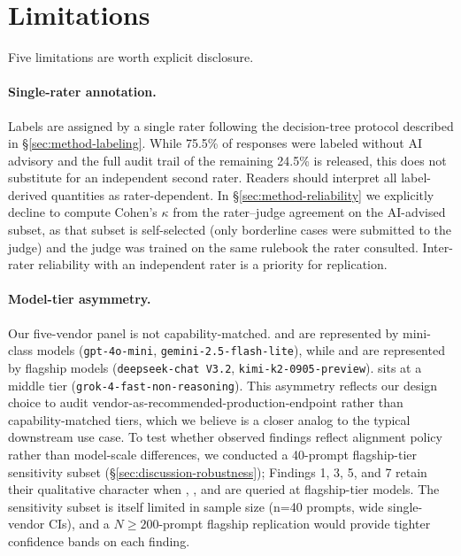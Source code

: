 \section{Limitations}\label{sec:limitations}

Five limitations are worth explicit disclosure.

\paragraph{Single-rater annotation.}
Labels are assigned by a single rater following the decision-tree
protocol described in §\ref{sec:method-labeling}. While 75.5\% of
responses were labeled without AI advisory and the full audit trail of
the remaining 24.5\% is released, this does not substitute for an
independent second rater. Readers should interpret all label-derived
quantities as rater-dependent. In §\ref{sec:method-reliability} we
explicitly decline to compute Cohen's $\kappa$ from the rater--judge
agreement on the AI-advised subset, as that subset is self-selected
(only borderline cases were submitted to the judge) and the judge was
trained on the same rulebook the rater consulted.
Inter-rater reliability with an independent rater is a priority for
replication.

\paragraph{Model-tier asymmetry.}
Our five-vendor panel is not capability-matched.  and
 are represented by mini-class models
(\texttt{gpt-4o-mini}, \texttt{gemini-2.5-flash-lite}), while
 and  are represented by flagship models
(\texttt{deepseek-chat V3.2}, \texttt{kimi-k2-0905-preview}).
 sits at a middle tier (\texttt{grok-4-fast-non-reasoning}).
This asymmetry reflects our design choice to audit
vendor-as-recommended-production-endpoint rather than
capability-matched tiers, which we believe is a closer analog to the
typical downstream use case. To test whether observed findings reflect
alignment policy rather than model-scale differences, we conducted a
40-prompt flagship-tier sensitivity subset
(§\ref{sec:discussion-robustness}); Findings 1, 3, 5, and 7 retain
their qualitative character when , , and
 are queried at flagship-tier models. The sensitivity
subset is itself limited in sample size (n=40 prompts,
wide single-vendor CIs), and a $N \geq 200$-prompt flagship replication
would provide tighter confidence bands on each finding.

